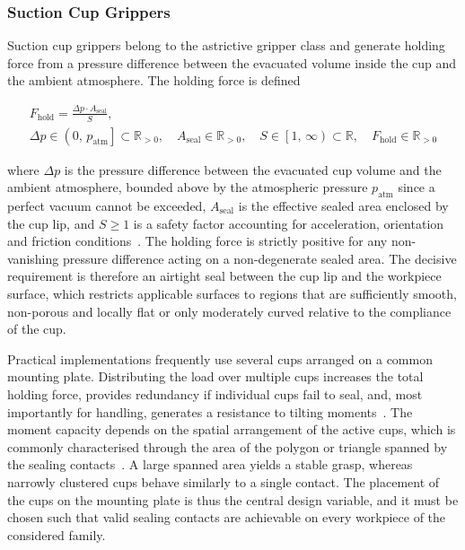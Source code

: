 \subsubsection{Suction Cup Grippers}
\label{subsubsec:suction_cup_grippers}

Suction cup grippers belong to the astrictive gripper class and generate holding force from a pressure difference between the evacuated volume inside
the cup and the ambient atmosphere. The holding force is defined 

\begin{equation}
    \begin{gathered}
        F_{\mathrm{hold}} = \frac{\Delta p \cdot A_{\mathrm{seal}}}{S}, \\[4pt]
        \Delta p \in \left(0,\, p_{\mathrm{atm}}\right] \subset \mathbb{R}_{>0},\quad
        A_{\mathrm{seal}} \in \mathbb{R}_{>0},\quad
        S \in \left[1,\, \infty\right) \subset \mathbb{R},\quad
        F_{\mathrm{hold}} \in \mathbb{R}_{>0}
    \end{gathered}
\end{equation}

where $\Delta p$ is the pressure difference between the evacuated cup volume and the ambient atmosphere, bounded above by the atmospheric pressure
$p_{\mathrm{atm}}$ since a perfect vacuum cannot be exceeded, $A_{\mathrm{seal}}$ is the effective sealed area enclosed by the cup lip, and $S \geq 1$
is a safety factor accounting for acceleration, orientation and friction conditions~\cite{Zhou2021Bio-Inspired,Gabriel2020Modeling}. The holding force
is strictly positive for any non-vanishing pressure difference acting on a non-degenerate sealed area. The decisive requirement is therefore an
airtight seal between the cup lip and the workpiece surface, which restricts applicable surfaces to regions that are sufficiently smooth, non-porous
and locally flat or only moderately curved relative to the compliance of the cup.

Practical implementations frequently use several cups arranged on a common mounting plate. Distributing the load over multiple cups increases the
total holding force, provides redundancy if individual cups fail to seal, and, most importantly for handling, generates a resistance to tilting
moments~\cite{Mantriota2006Optimal}. The moment capacity depends on the spatial arrangement of the active cups, which
is commonly characterised through the area of the polygon or triangle spanned by the sealing contacts~\cite{Gabriel2020Modeling}. A large spanned area
yields a stable grasp, whereas narrowly clustered cups behave similarly to a single contact. The placement of the cups on the mounting plate is thus
the central design variable, and it must be chosen such that valid sealing contacts are achievable on every workpiece of the considered family.

